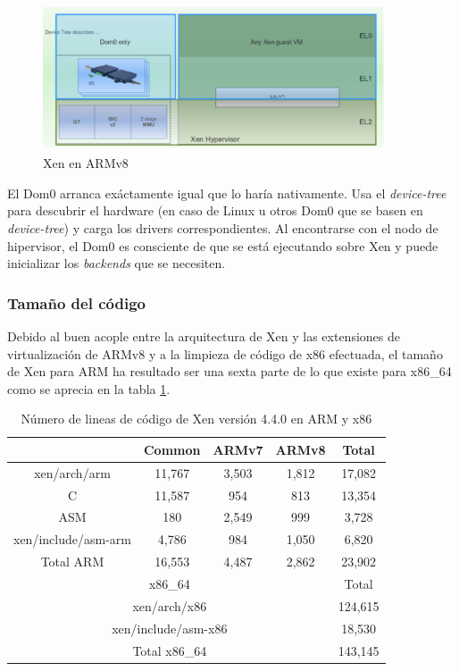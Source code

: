 \begin{figure}[!h]
  \centering
  \includegraphics[width=0.90\textwidth]{recursos/xen_3.png}
  \caption{Xen en ARMv8}
  \label{fig:xen_3}
\end{figure}

El Dom0 arranca exáctamente igual que lo haría nativamente. Usa el \textit{device-tree} para descubrir el hardware (en caso de Linux u otros Dom0 que se basen en \textit{device-tree}) y carga los drivers correspondientes. Al encontrarse con el nodo de hipervisor, el Dom0 es consciente de que se está ejecutando sobre Xen y puede inicializar los \textit{backends} que se necesiten.

\subsubsection{Tamaño del código}

Debido al buen acople entre la arquitectura de Xen y las extensiones de virtualización de ARMv8 y a la limpieza de código de x86 efectuada, el tamaño de Xen para ARM ha resultado ser una sexta parte de lo que existe para x86\_64 como se aprecia en la tabla \ref{table:results45}.

\begin{table}[!ht]
  \centering
	\begin{tabular}{ |c|c|c|c|c| }
		\hline
     & Common & ARMv7 & ARMv8 & Total\\
    \hline
    xen/arch/arm          & 11,767      & 3,503  & 1,812   & 17,082 \\
    \hline
    C                     & 11,587      & 954    & 813	    & 13,354 \\
    \hline
    ASM                   & 180         & 2,549  & 999     & 3,728  \\
    \hline
    xen/include/asm-arm   & 4,786       & 984    & 1,050   & 6,820  \\
    \hline
    Total ARM	            & 16,553  & 4,487  & 2,862        & 23,902 \\
    \hline
    \multicolumn{4}{|c|}{x86\_64}                           & Total\\
    \hline
    \multicolumn{4}{|c|}{xen/arch/x86}                      & 124,615\\
    \hline
    \multicolumn{4}{|c|}{xen/include/asm-x86}               & 18,530 \\
    \hline
    \multicolumn{4}{|c|}{Total x86\_64}                     & 143,145\\
    \hline
	\end{tabular}
	\caption{Número de lineas de código de Xen versión 4.4.0 en ARM y x86 \cite{xen_arm_whitepaper}}
  \label{table:results45}
\end{table}

